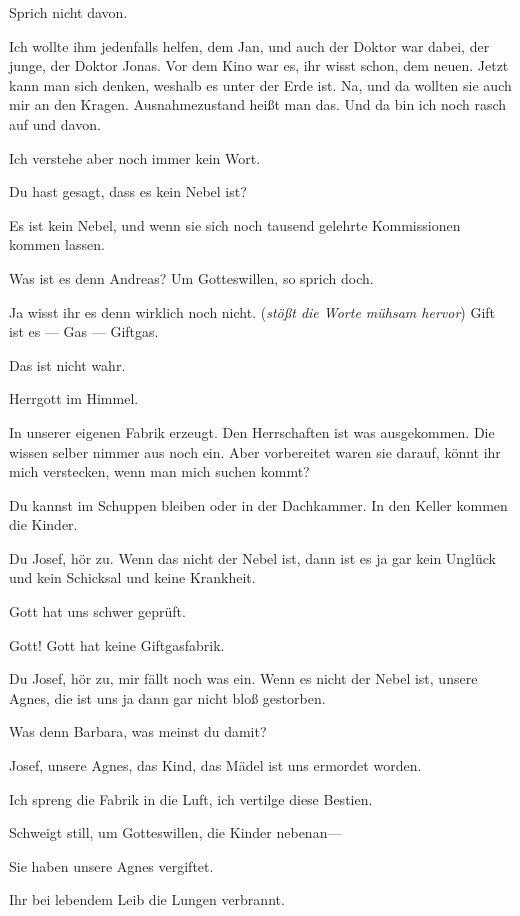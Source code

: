 \documentclass[
	final,
	a4paper,
	ngerman,
	mpinclude = true, %
	twoside = true,
	open = right,
	cleardoublepage = plain,
	DIV = 13,
	BCOR = 1cm,
	titlepage = firstiscover,
	]{scrbook}
\newcommand{\direction}[1]{(\textit{#1})}
\newcommand{\thecharacter}[1]{\textup{\textsc{#1}}\xspace}
\newcommand{\theBarbara}{\thecharacter{Barbara}}
\newcommand{\theJosef}{\thecharacter{Josef}}
\newcommand{\theAndreas}{\thecharacter{Andreas}}
\newcommand{\character}[1]{\item[#1]}
\newcommand{\Barbara}{\character{\theBarbara}}
\newcommand{\Josef}{\character{\theJosef}}
\newcommand{\Andreas}{\character{\theAndreas}}
\begin{document}
\begin{play}
\Barbara
Sprich nicht davon.

\Andreas
Ich wollte ihm jedenfalls helfen, dem Jan, und auch der Doktor war dabei, der junge, der Doktor Jonas. Vor dem Kino war es, ihr wisst schon, dem neuen. Jetzt kann man sich denken, weshalb es unter der Erde ist. Na, und da wollten sie auch mir an den Kragen. Ausnahmezustand heißt man das. Und da bin ich noch rasch auf und davon.

\Josef
Ich verstehe aber noch immer kein Wort.

\Barbara
Du hast gesagt, dass es kein Nebel ist?

\Andreas
Es ist kein Nebel, und wenn sie sich noch tausend gelehrte Kommissionen kommen lassen.

\Barbara
Was ist es denn Andreas? Um Gotteswillen, so sprich doch.

\Andreas
Ja wisst ihr es denn wirklich noch nicht. \direction{stößt die Worte mühsam hervor} Gift ist es --- Gas --- Giftgas.

\Josef
Das ist nicht wahr.

\Barbara
Herrgott im Himmel.

\Andreas
In unserer eigenen Fabrik erzeugt. Den Herrschaften ist was ausgekommen. Die wissen selber nimmer aus noch ein. Aber vorbereitet waren sie darauf, könnt ihr mich verstecken, wenn man mich suchen kommt?

\Josef
Du kannst im Schuppen bleiben oder in der Dachkammer. In den Keller kommen die Kinder.

\Barbara
Du Josef, hör zu. Wenn das nicht der Nebel ist, dann ist es ja gar kein Unglück und kein Schicksal und keine Krankheit.

\Josef
Gott hat uns schwer geprüft.

\Andreas
Gott! Gott hat keine Giftgasfabrik.

\Barbara
Du Josef, hör zu, mir fällt noch was ein. Wenn es nicht der Nebel ist, unsere Agnes, die ist uns ja dann gar nicht bloß gestorben.

\Josef
Was denn Barbara, was meinst du damit?

\Barbara
Josef, unsere Agnes, das Kind, das Mädel ist uns ermordet worden.

\Andreas
Ich spreng die Fabrik in die Luft, ich vertilge diese Bestien.

\Josef
Schweigt still, um Gotteswillen, die Kinder nebenan---

\Barbara
Sie haben unsere Agnes vergiftet.

\Andreas
Ihr bei lebendem Leib die Lungen verbrannt.


\end{play}
\end{document}
